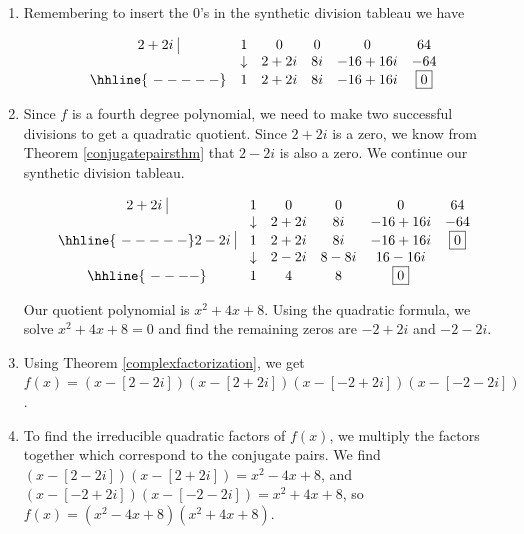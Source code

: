 \begin{exampleSol}

\begin{enumerate}

\item  Remembering to insert the $0$'s in the synthetic division tableau we have

\[ \begin{array}{cccccc}
 2+2i \, \, \vline& 1 & 0 & 0  & 0 & 64 \\

  & \downarrow     &  2+2i  &  8i & -16+16i & -64\\ \hhline{~-----} 
  
               & 1 &  2+2i  & 8i & -16+16i &  \fbox{$0$}  \\ \end{array}\]



\item  Since $f$ is a fourth degree polynomial, we need to make two successful divisions to get a quadratic quotient.  Since $2+2i$ is a zero, we know from Theorem \ref{conjugatepairsthm} that $2-2i$ is also a zero.  We continue our synthetic division tableau.

\[ \begin{array}{cccccc}
  2+2i \, \, \vline& 1 & 0 & 0  & 0 & 64 \\

  & \downarrow     &  2+2i  &  8i & -16+16i & -64\\ \hhline{~-----} 
  
  2-2i \, \, \vline  & 1 &  2+2i  & 8i & -16+16i &  \fbox{$0$}  \\
    
               & \downarrow &  2-2i  &  8-8i  & 16-16i &\\ \hhline{~----} 
 
                & 1  &  4  & 8& \fbox{0} &   \\
  


\end{array}\]

Our quotient polynomial is $x^2+4x+8$.  Using the quadratic formula, we solve $x^2+4x+8 = 0$ and find the remaining zeros are $-2+2i$ and $-2-2i$.  

\item  Using Theorem \ref{complexfactorization}, we get $f(x) = (x-[2-2i])(x-[2+2i])(x-[-2+2i])(x-[-2-2i])$.

\item  To find the irreducible quadratic factors of $f(x)$, we multiply the factors together which correspond to the conjugate pairs.  We find $(x-[2-2i])(x-[2+2i]) = x^2-4x+8$, and $(x-[-2+2i])(x-[-2-2i]) = x^2+4x+8$, so  $f(x) =  \left(x^2-4x+8\right) \left(x^2+4x+8\right)$.   

\end{enumerate}

\end{exampleSol}


